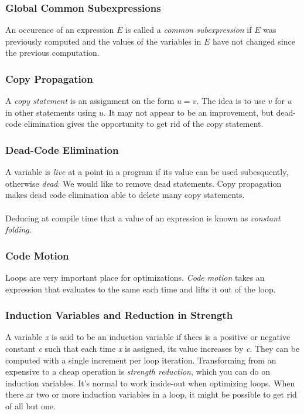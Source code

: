 \documentclass{article}
\begin{document}
\subsubsection{Global Common Subexpressions} %
\label{ssub:Global Common Subexpressions}
An occurence of an expression $E$ is called a \emph{common subexpression} if $E$ was previously computed and the values of the variables in $E$ have not changed since the previous computation.

\subsubsection{Copy Propagation} %
\label{ssub:Copy Propagation}
A \emph{copy statement} is an assignment on the form $u = v$. The idea is to use $v$ for $u$ in other statements using $u$. It may not appear to be an improvement, but dead-code elimination gives the opportunity to get rid of the copy statement.

\subsubsection{Dead-Code Elimination} %
\label{ssub:Dead-Code Elimination}
A variable is \emph{live} at a point in a program if its value can be used subesquently, otherwise \emph{dead}. We would like to remove dead statements. Copy propagation makes dead code elimination able to delete many copy statements.\\
\\ Deducing at compile time that a value of an expression is known as \emph{constant folding}.

\subsubsection{Code Motion} %
\label{ssub:Code Motion}
Loops are very important place for optimizations. \emph{Code motion} takes an expression that evaluates to the same each time and lifts it out of the loop.

\subsubsection{Induction Variables and Reduction in Strength} %
\label{ssub:Induction Variables and Reduction in Strength}
A variable \emph{x} is said to be an induction variable if thees is a positive or negative constant \emph{c} such that each time \emph{x} is assigned, its value increases by \emph{c}. They can be computed with a single increment per loop iteration. Transforming from an expensive to a cheap operation is \emph{strength reduction}, which you can do on induction variables. It's normal to work inside-out when optimizing loops. When there ar two or more induction variables in a loop, it might be possible to get rid of all but one.
\end{document}
